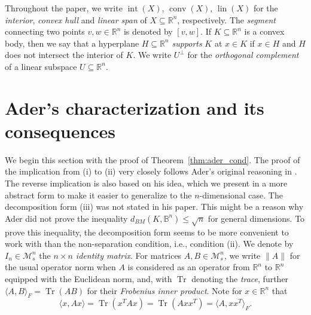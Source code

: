 \documentclass[12pt,a4paper]{article}
\theoremstyle{definition}
\DeclareMathOperator{\conv}{conv}
\DeclareMathOperator{\lin}{lin}
\DeclareMathOperator{\tr}{Tr}
\DeclareMathOperator{\inte}{int}
\newcommand\R{\mathbb{R}}
\newcommand\B{\mathbb{B}}
\newcommand\ms[1]{\mathcal{M}_s^{#1}}
\newcommand\cemph[1]{\emph{\color{red}#1}}
\begin{document}
Throughout the paper, we write $\inte(X)$, $\conv(X)$, $\lin(X)$ for the \cemph{interior}, \cemph{convex hull} and \cemph{linear span} of $X \subseteq \R^n$, respectively. The \cemph{segment} connecting two points $v, w \in \R^n$ is denoted by $[v, w]$. If $K \subseteq \R^n$ is a convex body, then we say that a hyperplane $H \subseteq \R^n$ \cemph{supports} $K$ at $x \in K$ if $x \in H$ and $H$ does not intersect the interior of $K$. We write $U^\perp$ for the \cemph{orthogonal complement} of a linear subspace $U \subseteq \R^n$.





\section{Ader's characterization and its consequences}
\label{sec:ader}



We begin this section with the proof of Theorem~\ref{thm:ader_cond}. The proof of the implication from (i) to (ii) very closely follows Ader's original reasoning in \cite{ader}. The reverse implication is also based on his idea, which we present in a more abstract form to make it easier to generalize to the $n$-dimensional case. The decomposition form (iii) was not stated in his paper. This might be a reason why Ader did not prove the inequality $d_{BM}(K,\B^n) \leq \sqrt{n}$ for general dimensions. To prove this inequality, the decomposition form seems to be more convenient to work with than the non-separation condition, i.e., condition (ii). We denote by $I_n \in \ms{n}$ the \cemph{$n \times n$ identity matrix}. For matrices $A,B \in \ms{n}$, we write $\|A\|$ for the usual operator norm when $A$ is considered as an operator from $\R^n$ to $\R^n$ equipped with the Euclidean norm, and, with $\tr$ denoting the \cemph{trace}, further $\langle A, B \rangle_F = \tr(A B)$ for their \cemph{Frobenius inner product}. Note for $x \in \R^n$ that
\begin{equation}
\label{eq:frobenius}
\langle x, A x \rangle = \tr(x^T A x) = \tr(A x x^T) = \langle A, x x^T \rangle_F.
\end{equation}
\end{document}
